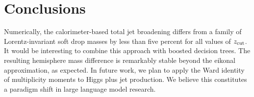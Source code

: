 \section{Conclusions}\label{sec:conclusions}

Numerically, the calorimeter-based total jet broadening differs from a
family of Lorentz-invariant soft drop masses by less than five percent
for all values of $z_{\rm cut}$. It would be interesting to combine this
approach with boosted decision trees. The resulting hemisphere mass
difference is remarkably stable beyond the eikonal approximation, as
expected. In future work, we plan to apply the Ward identity of
multiplicity moments to Higgs plus jet production. We believe this
constitutes a paradigm shift in large language model research.

